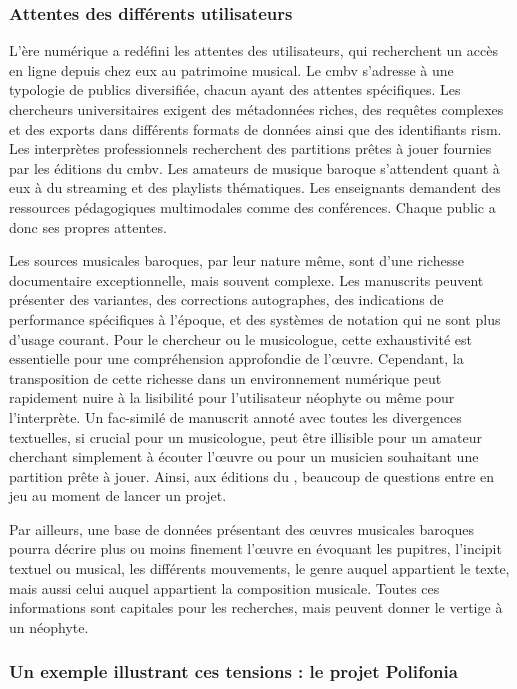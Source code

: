 \subsubsection{Attentes des différents utilisateurs}

L'ère numérique a redéfini les attentes des utilisateurs, qui recherchent un accès en ligne depuis chez eux au patrimoine musical. Le \gls{cmbv} s'adresse à une typologie de publics diversifiée, chacun ayant des attentes spécifiques. Les chercheurs universitaires exigent des métadonnées riches, des requêtes complexes et des exports dans différents formats de données ainsi que des identifiants \gls{rism}. Les interprètes professionnels recherchent des partitions prêtes à jouer fournies par les éditions du \gls{cmbv}. Les amateurs de musique baroque s'attendent quant à eux à du streaming et des playlists thématiques. Les enseignants demandent des ressources pédagogiques multimodales comme des conférences. Chaque public a donc ses propres attentes.

Les sources musicales baroques, par leur nature même, sont d'une richesse documentaire exceptionnelle, mais souvent complexe. Les manuscrits peuvent présenter des variantes, des corrections autographes, des indications de performance spécifiques à l'époque, et des systèmes de notation qui ne sont plus d'usage courant. Pour le chercheur ou le musicologue, cette exhaustivité est essentielle pour une compréhension approfondie de l'œuvre. Cependant, la transposition de cette richesse dans un environnement numérique peut rapidement nuire à la lisibilité pour l'utilisateur néophyte ou même pour l'interprète. Un fac-similé de manuscrit annoté avec toutes les divergences textuelles, si crucial pour un musicologue, peut être illisible pour un amateur cherchant simplement à écouter l'œuvre ou pour un musicien souhaitant une partition prête à jouer. Ainsi, aux éditions du , beaucoup de questions entre en jeu au moment de lancer un projet.

Par ailleurs, une base de données présentant des œuvres musicales baroques pourra décrire plus ou moins finement l'œuvre en évoquant les pupitres, l'incipit textuel ou musical, les différents mouvements, le genre auquel appartient le texte, mais aussi celui auquel appartient la composition musicale. Toutes ces informations sont capitales pour les recherches, mais peuvent donner le vertige à un néophyte.

\subsubsection{Un exemple illustrant ces tensions : le projet Polifonia}

